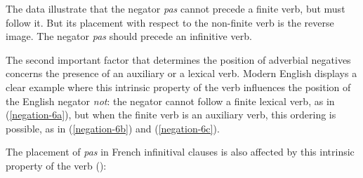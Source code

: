 \documentclass[output=paper
	        ,collection
	        ,collectionchapter
 	        ,biblatex
                ,babelshorthands
                ,newtxmath
                ,draftmode
                ,colorlinks, citecolor=brown
]{langscibook}
\begin{document}
{\begin{exe}
\begin{xlist}
\begin{exe}
\begin{xlist}
\eal{}
\zl

\noindent
The data illustrate that the negator \textit{pas} cannot precede a finite verb,
but must follow it. But its placement with respect to
the non-finite verb is the reverse image. The negator \textit{pas}
should precede an infinitive verb.

The second important factor that determines the position of adverbial
negatives concerns the presence of an auxiliary or a lexical  verb.
Modern English displays a clear example where this
intrinsic property of the verb influences the position of
the English negator \textit{not}: the negator cannot follow
a finite lexical  verb, as in (\ref{negation-6a}), but when the finite verb is an auxiliary verb,
this ordering is possible, as in (\ref{negation-6b}) and (\ref{negation-6c}).

\eal
{} \label{negation-6a}
 \label{negation-6b}
 \label{negation-6c}
\zl

\noindent
The placement of \textit{pas} in French infinitival
clauses is also affected by this intrinsic property of
the verb (\citealp[]{KS:02}):

\eal
{}
 \label{negation-28b}
\zl


\end{xlist}
\end{exe}
\end{xlist}
\end{exe}}
\end{document}
